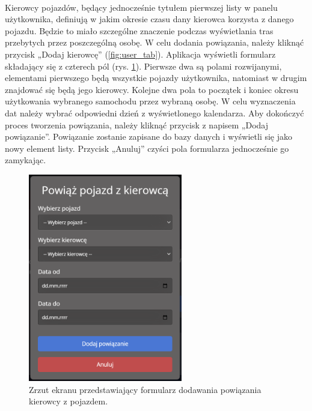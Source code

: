 \paragraph{}
Kierowcy pojazdów, będący jednocześnie tytułem pierwszej listy w panelu użytkownika, definiują w jakim okresie czasu dany kierowca korzysta z danego pojazdu. Będzie to miało szczególne znaczenie podczas wyświetlania tras przebytych przez poszczególną osobę. W celu dodania powiązania, należy kliknąć przycisk „Dodaj kierowcę” (\ref{fig:user_tab}). Aplikacja wyświetli formularz składający się z czterech pól (rys. \ref{fig:add_driver_vehicle}). Pierwsze dwa są polami rozwijanymi, elementami pierwszego będą wszystkie pojazdy użytkownika, natomiast w drugim znajdować się będą jego kierowcy. Kolejne dwa pola to początek i koniec okresu użytkowania wybranego samochodu przez wybraną osobę. W celu wyznaczenia dat należy wybrać odpowiedni dzień z wyświetlonego kalendarza. Aby dokończyć proces tworzenia powiązania, należy kliknąć przycisk z napisem „Dodaj powiązanie”. Powiązanie zostanie zapisane do bazy danych i wyświetli się jako nowy element listy. Przycisk „Anuluj” czyści pola formularza jednocześnie go zamykając.

\begin{figure}
	\centering
	\includegraphics[width=0.6\textwidth]{./graf/add_driver_vehicle.png}
	\caption{Zrzut ekranu przedstawiający formularz dodawania powiązania kierowcy z pojazdem.}
	\label{fig:add_driver_vehicle}
\end{figure}


